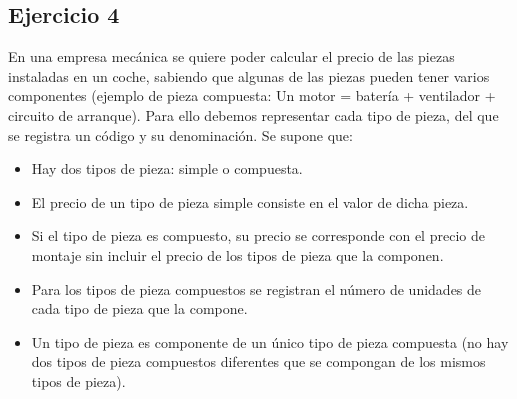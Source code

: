 \newpage
\subsection*{Ejercicio 4}

\noindent En una empresa mecánica se quiere poder calcular el precio de las piezas instaladas en 
un coche, sabiendo que algunas de las piezas pueden tener varios componentes 
(ejemplo de pieza compuesta: Un motor = batería + ventilador + circuito de arranque). 
Para ello debemos representar cada tipo de pieza, del que se registra un código y su 
denominación. Se supone que: 
 
\begin{itemize}
    \item Hay dos tipos de pieza: simple o compuesta.
    \item El precio de un tipo de pieza simple consiste en el valor de dicha pieza.
    \item Si el tipo de pieza es compuesto, su precio se corresponde con el precio de 
    montaje sin incluir el precio de los tipos de pieza que la componen.
    \item Para los tipos de pieza compuestos se registran el número de unidades de 
    cada tipo de pieza que la compone.
    \item Un tipo de pieza es componente de un único tipo de pieza compuesta (no hay 
    dos tipos de pieza compuestos diferentes que se compongan de los mismos 
    tipos de pieza).
\end{itemize}


